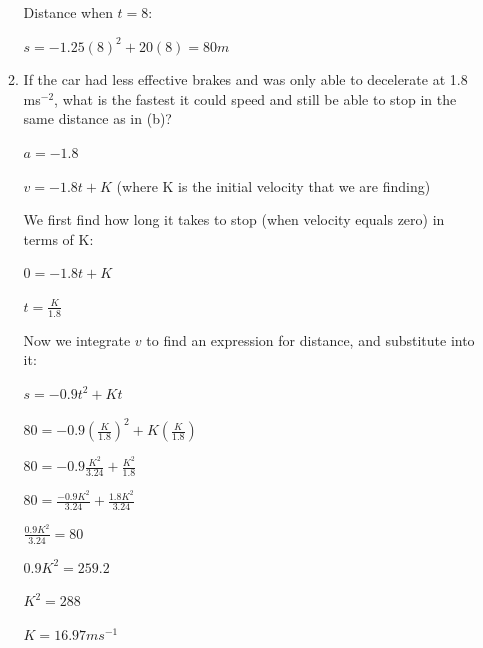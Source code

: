 \documentclass[12pt, letterpaper]{article}
\begin{document}
\begin{enumerate}[itemsep=2cm]
\begin{enumerate}[itemsep=2cm]
        Distance when $t=8$:

        $s=-1.25(8)^2+20(8)=80m$

        \item 
        If the car had less effective brakes and was only able to decelerate at 1.8 ms$^{-2}$, what is the fastest it could speed and still be able to stop in the same distance as in (b)?

        $a=-1.8$

        $v=-1.8t+K$ (where K is the initial velocity that we are finding)

        We first find how long it takes to stop (when velocity equals zero) in terms of K:

        $0=-1.8t+K$

        $t=\frac{K}{1.8}$

        Now we integrate $v$ to find an expression for distance, and substitute into it:

        $s=-0.9t^2+Kt$

        $80=-0.9(\frac{K}{1.8})^2+K(\frac{K}{1.8})$

        $80=-0.9\frac{K^2}{3.24}+\frac{K^2}{1.8}$

        $80=\frac{-0.9K^2}{3.24}+\frac{1.8K^2}{3.24}$

        $\frac{0.9K^2}{3.24}=80$

        $0.9K^2=259.2$

        $K^2=288$

        $K=16.97ms^{-1}$

    \end{enumerate}


\end{enumerate}
\end{document}
